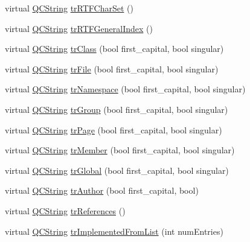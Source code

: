 \begin{DoxyCompactItemize}
\item 
virtual \mbox{\hyperlink{class_q_c_string}{Q\+C\+String}} \mbox{\hyperlink{class_translator_swedish_a15d3828ee6fc655c47861158c0aca7cb}{tr\+R\+T\+F\+Char\+Set}} ()
\item 
virtual \mbox{\hyperlink{class_q_c_string}{Q\+C\+String}} \mbox{\hyperlink{class_translator_swedish_aff612c7e94d8534b336246c3b325c210}{tr\+R\+T\+F\+General\+Index}} ()
\item 
virtual \mbox{\hyperlink{class_q_c_string}{Q\+C\+String}} \mbox{\hyperlink{class_translator_swedish_a26acc40ddf619631b95b6d8dad5896ee}{tr\+Class}} (bool first\+\_\+capital, bool singular)
\item 
virtual \mbox{\hyperlink{class_q_c_string}{Q\+C\+String}} \mbox{\hyperlink{class_translator_swedish_a48cec8611a80fa170571479b15ba0d4e}{tr\+File}} (bool first\+\_\+capital, bool singular)
\item 
virtual \mbox{\hyperlink{class_q_c_string}{Q\+C\+String}} \mbox{\hyperlink{class_translator_swedish_aa9a556538d0a25b97bdae7576b4b46c1}{tr\+Namespace}} (bool first\+\_\+capital, bool singular)
\item 
virtual \mbox{\hyperlink{class_q_c_string}{Q\+C\+String}} \mbox{\hyperlink{class_translator_swedish_a19b0e56378fccc350129ad5fbb64fc4a}{tr\+Group}} (bool first\+\_\+capital, bool singular)
\item 
virtual \mbox{\hyperlink{class_q_c_string}{Q\+C\+String}} \mbox{\hyperlink{class_translator_swedish_ab22c79420022d4e97411fed16c34fe01}{tr\+Page}} (bool first\+\_\+capital, bool singular)
\item 
virtual \mbox{\hyperlink{class_q_c_string}{Q\+C\+String}} \mbox{\hyperlink{class_translator_swedish_a0eeef1b59e1f6ccd48d7638f0064fb10}{tr\+Member}} (bool first\+\_\+capital, bool singular)
\item 
virtual \mbox{\hyperlink{class_q_c_string}{Q\+C\+String}} \mbox{\hyperlink{class_translator_swedish_aed9e16cc2dbe30bb5ab30cf7ddc7f4cb}{tr\+Global}} (bool first\+\_\+capital, bool singular)
\item 
virtual \mbox{\hyperlink{class_q_c_string}{Q\+C\+String}} \mbox{\hyperlink{class_translator_swedish_a717ca5ea8f7e681c1db5a1b7e8bdf4c0}{tr\+Author}} (bool first\+\_\+capital, bool)
\item 
virtual \mbox{\hyperlink{class_q_c_string}{Q\+C\+String}} \mbox{\hyperlink{class_translator_swedish_ae65478edcd784c004882fa26d6d6044d}{tr\+References}} ()
\item 
virtual \mbox{\hyperlink{class_q_c_string}{Q\+C\+String}} \mbox{\hyperlink{class_translator_swedish_a21510bb58e60d35465a39379543e16c1}{tr\+Implemented\+From\+List}} (int num\+Entries)

\end{DoxyCompactItemize}
